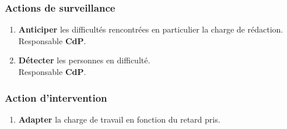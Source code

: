 \subsubsection{Actions de surveillance}

\begin{enumerate}
\item {\bf Anticiper} les difficultés rencontrées en particulier la charge de
rédaction. \\
Responsable {\bf CdP}.
\item {\bf Détecter} les personnes en difficulté. \\
Responsable {\bf CdP}.
\end{enumerate}

\subsubsection{Action d'intervention}

\begin{enumerate}
\item {\bf Adapter} la charge de travail en fonction du retard pris.
\end{enumerate}
